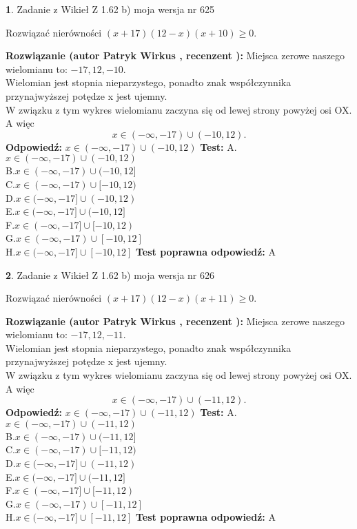 \documentclass[12pt, a4paper]{article}
\theoremstyle{definition} %
\newtheorem{zad}{}
\newcommand{\zadStart}[1]{\begin{zad}#1\newline}
\newcommand{\zadStop}{\end{zad}}
\newcommand{\rozwStart}[2]{\noindent \textbf{Rozwiązanie (autor #1 , recenzent #2): }\newline}
\newcommand{\rozwStop}{\newline}
\newcommand{\odpStart}{\noindent \textbf{Odpowiedź:}\newline}
\newcommand{\odpStop}{\newline}
\newcommand{\testStart}{\noindent \textbf{Test:}\newline}
\newcommand{\testStop}{\newline}
\newcommand{\kluczStart}{\noindent \textbf{Test poprawna odpowiedź:}\newline}
\newcommand{\kluczStop}{\newline}
\begin{document}
\zadStart{Zadanie z Wikieł Z 1.62 b) moja wersja nr 625}

Rozwiązać nierówności $(x+17)(12-x)(x+10)\ge0$.
\zadStop
\rozwStart{Patryk Wirkus}{}
Miejsca zerowe naszego wielomianu to: $-17, 12, -10$.\\
Wielomian jest stopnia nieparzystego, ponadto znak współczynnika przy\linebreak najwyższej potędze x jest ujemny.\\ W związku z tym wykres wielomianu zaczyna się od lewej strony powyżej osi OX. A więc $$x \in (-\infty,-17) \cup (-10,12).$$
\rozwStop
\odpStart
$x \in (-\infty,-17) \cup (-10,12)$
\odpStop
\testStart
A.$x \in (-\infty,-17) \cup (-10,12)$\\
B.$x \in (-\infty,-17) \cup (-10,12]$\\
C.$x \in (-\infty,-17) \cup [-10,12)$\\
D.$x \in (-\infty,-17] \cup (-10,12)$\\
E.$x \in (-\infty,-17] \cup (-10,12]$\\
F.$x \in (-\infty,-17] \cup [-10,12)$\\
G.$x \in (-\infty,-17) \cup [-10,12]$\\
H.$x \in (-\infty,-17] \cup [-10,12]$
\testStop
\kluczStart
A
\kluczStop



\zadStart{Zadanie z Wikieł Z 1.62 b) moja wersja nr 626}

Rozwiązać nierówności $(x+17)(12-x)(x+11)\ge0$.
\zadStop
\rozwStart{Patryk Wirkus}{}
Miejsca zerowe naszego wielomianu to: $-17, 12, -11$.\\
Wielomian jest stopnia nieparzystego, ponadto znak współczynnika przy\linebreak najwyższej potędze x jest ujemny.\\ W związku z tym wykres wielomianu zaczyna się od lewej strony powyżej osi OX. A więc $$x \in (-\infty,-17) \cup (-11,12).$$
\rozwStop
\odpStart
$x \in (-\infty,-17) \cup (-11,12)$
\odpStop
\testStart
A.$x \in (-\infty,-17) \cup (-11,12)$\\
B.$x \in (-\infty,-17) \cup (-11,12]$\\
C.$x \in (-\infty,-17) \cup [-11,12)$\\
D.$x \in (-\infty,-17] \cup (-11,12)$\\
E.$x \in (-\infty,-17] \cup (-11,12]$\\
F.$x \in (-\infty,-17] \cup [-11,12)$\\
G.$x \in (-\infty,-17) \cup [-11,12]$\\
H.$x \in (-\infty,-17] \cup [-11,12]$
\testStop
\kluczStart
A
\kluczStop
\end{document}
